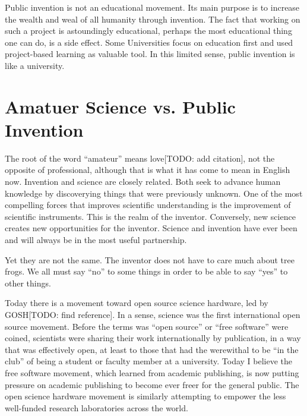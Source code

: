\documentclass[
	fontsize=10pt, %
	twoside=false, %
	secnumdepth=1, %
]{kaobook}
\begin{document}
Public invention is not an educational movement.
Its main purpose is to increase the wealth and
weal of all humanity through invention.
The fact that working on such a project is astoundingly
educational, perhaps the most educational thing one can do,
is a side effect. Some Universities focus on education
first and used project-based learning as valuable tool.
In this limited sense, public invention is like a university.

\chapter{Amatuer Science vs. Public Invention}

The root of the word ``amateur'' means love[TODO: add citation], not the
opposite of professional, although that is what it has come to mean in English now.
Invention and science are closely related.
Both seek to advance human knowledge by discoverying things
that were previously unknown.
One of the most compelling forces that improves scientific understanding
is the improvement of scientific instruments.
This is the realm of the inventor.
Conversely, new science creates new opportunities for the inventor.
Science and invention have ever been and will always be in
the most useful partnership.

Yet they are not the same. The inventor does not
have to care much about tree frogs.
We all must say ``no'' to some things in order to be able to say ``yes'' to other things.

Today there is a movement toward open source science hardware, led by GOSH[TODO: find reference].
In a sense, science was the first international open source movement.
Before the terms was ``open source'' or ``free software'' were coined,
scientists were sharing their work internationally by publication,
in a way that was effectively open, at least to those that had the
werewithal to be ``in the club'' of being a student or faculty member at a
university. Today I believe the free software movement, which learned
from academic publishing, is now putting pressure on academic publishing to
become ever freer for the general public.
The open science hardware movement is similarly attempting to
empower the less well-funded research laboratories across the world.
\end{document}
